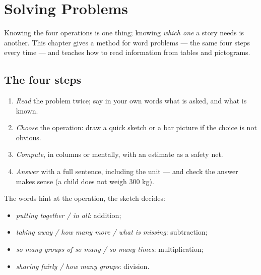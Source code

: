 \chapter{Solving Problems}\label{ch:g3:problems}

Knowing the four operations is one thing; knowing \emph{which one} a
story needs is another. This chapter gives a method for word
problems --- the same four steps every time --- and teaches how to
read information from tables and pictograms.

\section{The four steps}

\begin{method}\label{met:g3:problems:steps}
\begin{enumerate}
  \item \emph{Read} the problem twice; say in your own words what is
        asked, and what is known.
  \item \emph{Choose} the operation: draw a quick sketch or a bar
        picture if the choice is not obvious.
  \item \emph{Compute}, in columns or mentally, with an estimate as a
        safety net.
  \item \emph{Answer} with a full sentence, including the unit ---
        and check the answer makes sense (a child does not weigh
        $300$ kg).
\end{enumerate}
\end{method}

\begin{example}\label{ex:g3:problems:which}
The words hint at the operation, the sketch decides:
\begin{itemize}
  \item \emph{putting together / in all}: addition;
  \item \emph{taking away / how many more / what is missing}:
        subtraction;
  \item \emph{so many groups of so many / so many times}:
        multiplication;
  \item \emph{sharing fairly / how many groups}: division.
\end{itemize}
\end{example}

